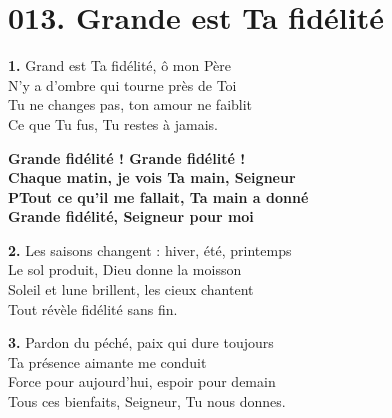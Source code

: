 \documentclass[]{article}
\begin{document}
\hypertarget{h013}{}
\section*{013. Grande est Ta fidélité}
\label{h:013}

\vspace{-0.8em}

\vspace{0.8em}
\medskip
\noindent\textbf{1.} Grand est Ta fidélité, ô mon Père\\
N'y a d'ombre qui tourne près de Toi\\
Tu ne changes pas, ton amour ne faiblit\\
Ce que Tu fus, Tu restes à jamais.

\medskip
\indent\textbf{Grande fidélité ! Grande fidélité !}\\
\indent\textbf{Chaque matin, je vois Ta main, Seigneur}\\
\indent\textbf{PTout ce qu'il me fallait, Ta main a donné}\\
\indent\textbf{Grande fidélité, Seigneur pour moi}

\medskip
\noindent\textbf{2.} Les saisons changent : hiver, été, printemps\\
Le sol produit, Dieu donne la moisson\\
Soleil et lune brillent, les cieux chantent\\
Tout révèle fidélité sans fin.

\medskip
\noindent\textbf{3.} Pardon du péché, paix qui dure toujours\\
Ta présence aimante me conduit\\
Force pour aujourd'hui, espoir pour demain\\
Tous ces bienfaits, Seigneur, Tu nous donnes.
\end{document}
